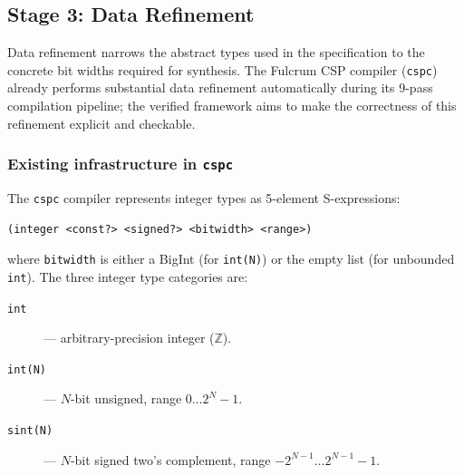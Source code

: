 \documentclass[11pt]{article}
\begin{document}
\subsection{Stage 3: Data Refinement}
\label{sec:stage3}

Data refinement narrows the abstract types used in the specification
to the concrete bit widths required for synthesis.  The Fulcrum CSP
compiler (\texttt{cspc}) already performs substantial data refinement
automatically during its 9-pass compilation pipeline; the verified
framework aims to make the correctness of this refinement explicit
and checkable.

\subsubsection{Existing infrastructure in \texttt{cspc}}

The \texttt{cspc} compiler represents integer types as 5-element
S-expressions:
\begin{Verbatim}[samepage=true]
(integer <const?> <signed?> <bitwidth> <range>)
\end{Verbatim}
where \texttt{bitwidth} is either a BigInt (for \texttt{int(N)}) or
the empty list (for unbounded \texttt{int}).  The three integer type
categories are:
\begin{description}
\item[\texttt{int}] --- arbitrary-precision integer ($\mathbb{Z}$).
\item[\texttt{int(N)}] --- $N$-bit unsigned, range $0 \ldots 2^N-1$.
\item[\texttt{sint(N)}] --- $N$-bit signed two's complement,
  range $-2^{N-1} \ldots 2^{N-1}-1$.
\end{description}
\end{document}
